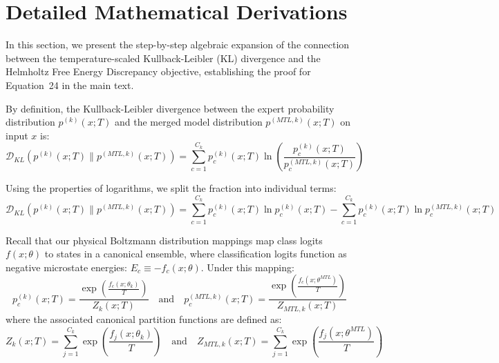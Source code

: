 \documentclass{article}
\theoremstyle{plain}
\theoremstyle{definition}
\theoremstyle{remark}
\begin{document}










\newpage
\appendix
\onecolumn

\section{Detailed Mathematical Derivations}
\label{sec:math_derivation}

In this section, we present the step-by-step algebraic expansion of the connection between the temperature-scaled Kullback-Leibler (KL) divergence and the Helmholtz Free Energy Discrepancy objective, establishing the proof for Equation~24 in the main text.

By definition, the Kullback-Leibler divergence between the expert probability distribution $p^{(k)}(x; T)$ and the merged model distribution $p^{(MTL, k)}(x; T)$ on input $x$ is:
\begin{equation}
\mathcal{D}_{KL} \left( p^{(k)}(x; T) \parallel p^{(MTL, k)}(x; T) \right) = \sum_{c=1}^{C_k} p_c^{(k)}(x; T) \ln \left( \frac{p_c^{(k)}(x; T)}{p_c^{(MTL, k)}(x; T)} \right)
\end{equation}

Using the properties of logarithms, we split the fraction into individual terms:
\begin{equation}
\label{eq:app_split}
\mathcal{D}_{KL} \left( p^{(k)}(x; T) \parallel p^{(MTL, k)}(x; T) \right) = \sum_{c=1}^{C_k} p_c^{(k)}(x; T) \ln p_c^{(k)}(x; T) - \sum_{c=1}^{C_k} p_c^{(k)}(x; T) \ln p_c^{(MTL, k)}(x; T)
\end{equation}

Recall that our physical Boltzmann distribution mappings map class logits $f(x; \theta)$ to states in a canonical ensemble, where classification logits function as negative microstate energies: $E_c \equiv -f_c(x; \theta)$. Under this mapping:
\begin{equation}
\label{eq:app_boltz_expert}
p_c^{(k)}(x; T) = \frac{\exp\left( \frac{f_c(x; \theta_k)}{T} \right)}{Z_k(x; T)} \quad \text{and} \quad p_c^{(MTL, k)}(x; T) = \frac{\exp\left( \frac{f_c(x; \theta^{MTL})}{T} \right)}{Z_{MTL, k}(x; T)}
\end{equation}
where the associated canonical partition functions are defined as:
\begin{equation}
Z_k(x; T) = \sum_{j=1}^{C_k} \exp\left( \frac{f_j(x; \theta_k)}{T} \right) \quad \text{and} \quad Z_{MTL, k}(x; T) = \sum_{j=1}^{C_k} \exp\left( \frac{f_j(x; \theta^{MTL})}{T} \right)
\end{equation}
\end{document}
